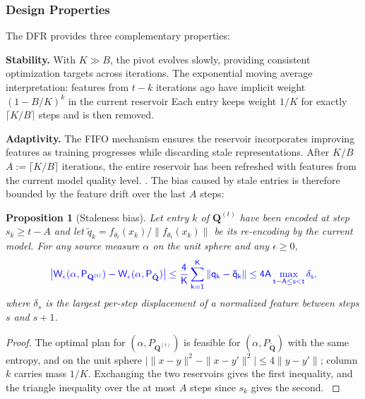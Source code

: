 \documentclass[preprint,12pt]{elsarticle}
\newtheorem{proposition}[theorem]{Proposition}
\providecommand{\DIFadd}[1]{{\protect\color{blue} \sf #1}} %
\providecommand{\DIFdel}[1]{{\protect\color{red} \scriptsize #1}} %
\providecommand{\DIFaddbegin}{} %
\providecommand{\DIFaddend}{} %
\providecommand{\DIFdelbegin}{} %
\providecommand{\DIFdelend}{} %
\newcommand{\DIFscaledelfig}{0.5}
\newlength{\DIFdelgraphicswidth} %
\newlength{\DIFdelgraphicsheight} %
\newcommand{\DIFaddincludegraphics}[2][]{{\color{blue}\fbox{\DIFOincludegraphics[#1]{#2}}}} %
\newcommand{\DIFdelincludegraphics}[2][]{%
\sbox{\DIFdelgraphicsbox}{\DIFOincludegraphics[#1]{#2}}%
\settoboxwidth{\DIFdelgraphicswidth}{\DIFdelgraphicsbox} %
\settoboxtotalheight{\DIFdelgraphicsheight}{\DIFdelgraphicsbox} %
\scalebox{\DIFscaledelfig}{%
\parbox[b]{\DIFdelgraphicswidth}{\usebox{\DIFdelgraphicsbox}\\[-\baselineskip] \rule{\DIFdelgraphicswidth}{0em}}\llap{\resizebox{\DIFdelgraphicswidth}{\DIFdelgraphicsheight}{%
\setlength{\unitlength}{\DIFdelgraphicswidth}%
\begin{picture}(1,1)%
\thicklines\linethickness{2pt} %
{\color[rgb]{1,0,0}\put(0,0){\framebox(1,1){}}}%
{\color[rgb]{1,0,0}\put(0,0){\line( 1,1){1}}}%
{\color[rgb]{1,0,0}\put(0,1){\line(1,-1){1}}}%
\end{picture}%
}\hspace*{3pt}}} %
} %
\DeclareRobustCommand{\DIFaddbegin}{\DIFOaddbegin \let\includegraphics\DIFaddincludegraphics} %
\DeclareRobustCommand{\DIFaddend}{\DIFOaddend \let\includegraphics\DIFOincludegraphics} %
\DeclareRobustCommand{\DIFdelbegin}{\DIFOdelbegin \let\includegraphics\DIFdelincludegraphics} %
\DeclareRobustCommand{\DIFdelend}{\DIFOaddend \let\includegraphics\DIFOincludegraphics} %
\begin{document}
\subsubsection{Design Properties}

The DFR provides three complementary properties:

\textbf{Stability.} With $K \gg B$, the pivot evolves slowly, providing consistent optimization targets across iterations. \DIFdelbegin \DIFdel{The exponential moving average interpretation: features from $t-k$ iterations ago have implicit weight $(1 - B/K)^k$ in the current reservoir}\DIFdelend \DIFaddbegin \DIFadd{Each entry keeps weight $1/K$ for exactly $\lceil K/B\rceil$ steps and is then removed}\DIFaddend .

\textbf{Adaptivity.} The FIFO mechanism ensures the reservoir incorporates improving features as training progresses while discarding stale representations. After \DIFdelbegin \DIFdel{$K/B$ }\DIFdelend \DIFaddbegin \DIFadd{$A:=\lceil K/B\rceil$ }\DIFaddend iterations, the entire reservoir has been refreshed\DIFdelbegin \DIFdel{with features from the current model quality level. }\DIFdelend \DIFaddbegin \DIFadd{. The bias caused by stale entries is therefore bounded by the feature drift over the last $A$ steps:
}\DIFaddend 

\DIFaddbegin \begin{proposition}[Staleness bias]
\label{prop:staleness}
\DIFadd{Let entry $k$ of $\mathbf Q^{(t)}$ have been encoded at step $s_k\ge t-A$ and let $\tilde q_k=f_{\theta_t}(x_k)/\|f_{\theta_t}(x_k)\|$ be its re-encoding by the current model. For any source measure $\alpha$ on the unit sphere and any $\epsilon\ge0$,
}\begin{equation}
\DIFadd{\big|W_\epsilon(\alpha,P_{\mathbf Q^{(t)}})-W_\epsilon(\alpha,P_{\tilde{\mathbf Q}})\big|\le\frac{4}{K}\sum_{k=1}^K\|q_k-\tilde q_k\|\le 4A\max_{t-A\le s<t}\delta_s ,
}\end{equation}
\DIFadd{where $\delta_s$ is the largest per-step displacement of a normalized feature between steps $s$ and $s+1$.
}\end{proposition}
\begin{proof}
\DIFadd{The optimal plan for $(\alpha,P_{\mathbf Q^{(t)}})$ is feasible for $(\alpha,P_{\tilde{\mathbf Q}})$ with the same entropy, and on the unit sphere $\big|\|x-y\|^2-\|x-y'\|^2\big|\le4\|y-y'\|$; column $k$ carries mass $1/K$. Exchanging the two reservoirs gives the first inequality, and the triangle inequality over the at most $A$ steps since $s_k$ gives the second.
}\end{proof}
\end{document}
